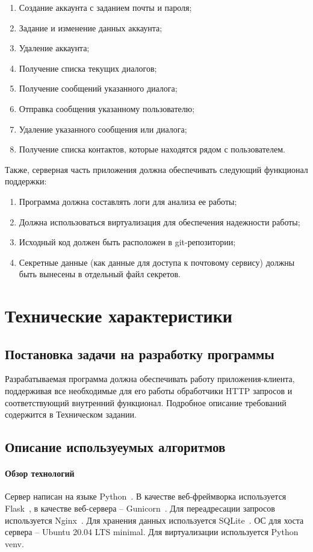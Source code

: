 \documentclass[explnote]{espd}
\begin{document}
\begin{enumerate}
\item Создание аккаунта с заданием почты и пароля;
\item Задание и изменение данных аккаунта;
\item Удаление аккаунта;
\item Получение списка текущих диалогов;
\item Получение сообщений указанного диалога;
\item Отправка сообщения указанному пользователю;
\item Удаление указанного сообщения или диалога;
\item Получение списка контактов, которые находятся рядом с пользователем.
\end{enumerate}

Также, серверная часть приложения должна обеспечивать следующий функционал поддержки:

\begin{enumerate}
\item Программа должна составлять логи для анализа ее работы;
\item Должна использоваться виртуализация для обеспечения надежности работы;
\item Исходный код должен быть расположен в git-репозитории;
\item Секретные данные (как данные для доступа к почтовому сервису) должны быть вынесены в отдельный файл секретов.
\end{enumerate}

\section{Технические характеристики}
\subsection{Постановка задачи на разработку программы}
Разрабатываемая программа должна обеспечивать работу приложения-клиента, поддерживая все необходимые для его работы обработчики HTTP запросов и соответствующий внутренний функционал. Подробное описание требований содержится в Техническом задании.

\subsection{Описание используеумых алгоритмов}
\paragraph{Обзор технологий}
Сервер написан на языке Python~\cite{python}. В качестве веб-фреймворка используется Flask~\cite{flask}, в качестве веб-сервера -- Gunicorn~\cite{gunicorn}. Для переадресации запросов используется Nginx~\cite{nginx}. Для хранения данных используется SQLite~\cite{sqlite}. ОС для хоста сервера -- Ubuntu 20.04 LTS minimal. Для виртуализации используется Python venv.
\end{document}
